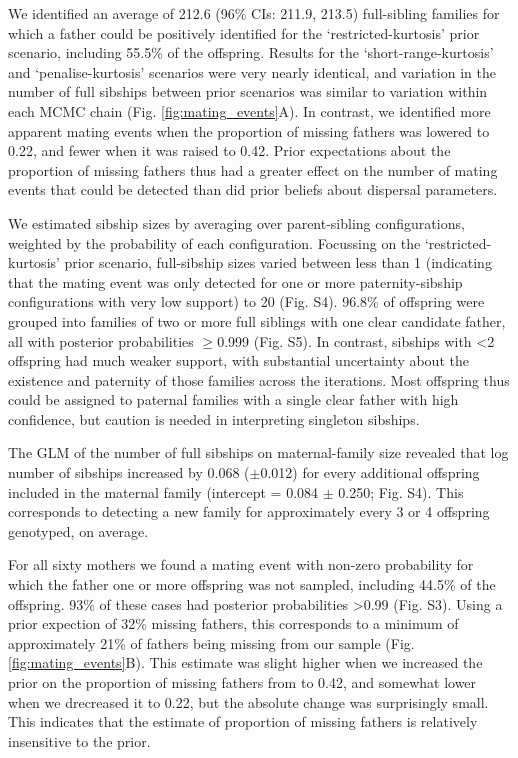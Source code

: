 \documentclass[10pt, a4paper, twocolumn]{article} %
\begin{document}
We identified an average of 212.6 (96\% CIs: 211.9, 213.5) full-sibling families for which a father could be positively identified for the ‘restricted-kurtosis’ prior scenario, including 55.5\% of the offspring. Results for the ‘short-range-kurtosis’ and ‘penalise-kurtosis’ scenarios were very nearly identical, and variation in the number of full sibships between prior scenarios was similar to variation within each MCMC chain (Fig. \ref{fig:mating_events}A). In contrast, we identified more apparent mating events when the proportion of missing fathers was lowered to 0.22, and fewer when it was raised to 0.42. Prior expectations about the proportion of missing fathers thus had a greater effect on the number of mating events that could be detected than did prior beliefs about dispersal parameters.

We estimated sibship sizes by averaging over parent-sibling configurations, weighted by the probability of each configuration. Focussing on the ‘restricted-kurtosis’ prior scenario, full-sibship sizes varied between less than 1 (indicating that the mating event was only detected for one or more paternity-sibship configurations with very low support) to 20 (Fig. S4). 96.8\% of offspring were grouped into families of two or more full siblings with one clear candidate father, all with posterior probabilities $\geq$0.999 (Fig. S5). In contrast, sibships with <2 offspring had much weaker support, with substantial uncertainty about the existence and paternity of those families across the iterations. Most offspring thus could be assigned to paternal families with a single clear father with high confidence, but caution is needed in interpreting singleton sibships.

The GLM of the number of full sibships on maternal-family size revealed that log number of sibships increased by 0.068 ($\pm$0.012) for every additional offspring included in the maternal family (intercept = 0.084 $\pm$ 0.250; Fig. S4). This corresponds to detecting a new family for approximately every 3 or 4 offspring genotyped, on average.

For all sixty mothers we found a mating event with non-zero probability for which the father one or more offspring was not sampled, including 44.5\% of the offspring. 93\% of these cases had posterior probabilities >0.99 (Fig. S3). Using a prior expection of 32\% missing fathers, this corresponds to a minimum of approximately 21\% of fathers being missing from our sample (Fig. \ref{fig:mating_events}B). This estimate was slight higher when we increased the prior on the proportion of missing fathers from to 0.42, and somewhat lower when we drecreased it to 0.22, but the absolute change was surprisingly small. This indicates that the estimate of proportion of missing fathers is relatively insensitive to the prior.
\end{document}
